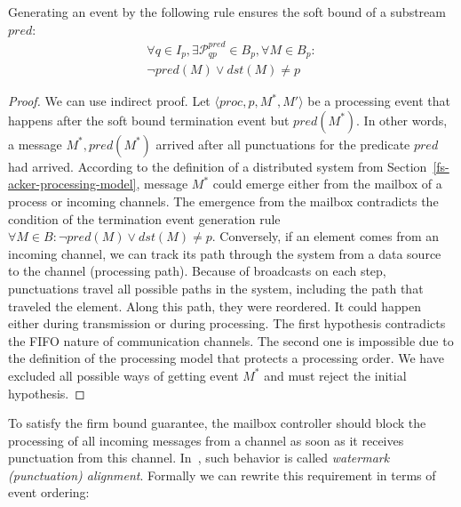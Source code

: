 \begin{lemma}
Generating an event by the following rule ensures the soft bound of a substream $pred$:
\begin{multline}
\forall q \in I_p, \exists \mathcal{P}^{pred}_{qp} \in B_p, \forall M\in B_p : \\ \neg pred(M) \vee dst(M) \ne p
\end{multline}
\end{lemma}

\begin{proof}
We can use indirect proof. Let $\langle proc, p, M^*, M' \rangle$ be a processing event that happens after the soft bound termination event but $pred(M^*)$. In other words, a message $M^*, pred(M^*)$ arrived after all punctuations for the predicate $pred$ had arrived. According to the definition of a distributed system from Section~\ref{fs-acker-processing-model}, message $M^*$ could emerge either from the mailbox of a process or incoming channels. The emergence from the mailbox contradicts the condition of the termination event generation rule $\forall M\in B : \neg pred(M) \vee dst(M) \ne p$.
Conversely, if an element comes from an incoming channel, we can track its path through the system from a data source to the channel (processing path). Because of broadcasts on each step, punctuations travel all possible paths in the system, including the path that traveled the element. Along this path, they were reordered. It could happen either during transmission or during processing. The first hypothesis contradicts the FIFO nature of communication channels. The second one is impossible due to the definition of the processing model that protects a processing order. We have excluded all possible ways of getting event $M^*$ and must reject the initial hypothesis.
\end{proof}

To satisfy the firm bound guarantee, the mailbox controller should block the processing of all incoming messages from a channel as soon as it receives punctuation from this channel. In~\cite{Carbone:2017:SMA:3137765.3137777}, such behavior is called {\em watermark (punctuation) alignment}. Formally we can rewrite this requirement in terms of event ordering:

